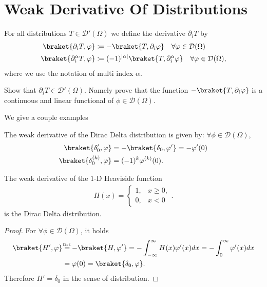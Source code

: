 \section{Weak Derivative Of Distributions}
\begin{definition}
 For all distributions  $T \in  \mathcal{D}'(\Omega )$  we define the derivative $\partial_i T$ by 
 \begin{align*}
   \braket{\partial_i T,\phi } &\coloneqq -\braket{T,\partial_i \phi } \quad \forall \phi  \in \mathcal{D}(\Omega)\\
   \braket{\partial_i^{\alpha }  T,\phi } &\coloneqq (-1)^{\abs{\alpha }} \braket{T,\partial_i^{\alpha }  \phi } \quad \forall \phi  \in \mathcal{D}(\Omega),
\end{align*}
where we use the notation of multi index $\alpha $.
\end{definition}
\begin{exercise}
 Show that $\partial_i T\in \mathcal{D}'(\Omega )$. Namely prove that the function $-\braket{T,\partial_i \phi }$  is a continuous and linear functional of $\phi\in\mathcal{D}(\Omega )$.  
\end{exercise}
We give a couple examples 
\begin{example}
 The weak derivative of the Dirac Delta distribution is given by:  $\forall \phi  \in  \mathcal{D}(\Omega )$,
 \begin{align*}
   \braket{\delta'_0,\phi } &= - \braket{\delta_0,\phi'} = -\phi'(0)\\
   \braket{\delta_0^{(k)},\phi  } &= (-1)^{k} \phi ^{(k)}  (0)
 .\end{align*}
\end{example}
\begin{lemma}
 The weak derivative of the $1$-D Heaviside function 
 \begin{align*}
  H(x) = \begin{cases}
    1, &x\ge 0,\\
    0,&x<0
  \end{cases}
 .\end{align*}
 is the Dirac Delta distribution.
\end{lemma}
\begin{proof}
 For $\forall  \phi  \in \mathcal{D}(\Omega )$,  it holds 
 \begin{align*}
   \braket{H',\phi } &\myS{Def.}{=} -\braket{H,\phi'}= - \int_{-\infty}^{\infty} H(x)\phi'(x)  dx = - \int_0^{\infty} \phi'(x) dx \\
                     &= \phi(0) = \braket{\delta_0,\phi }
 .\end{align*}
 Therefore  $ H' = \delta_0$ in the sense of distribution.
\end{proof}

